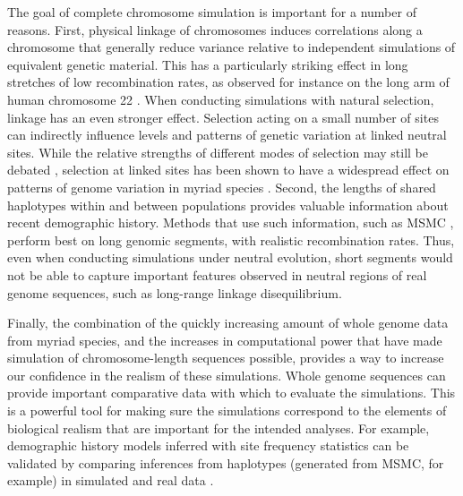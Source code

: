\documentclass[hidelinks]{article}
\begin{document}
The goal of complete chromosome simulation is important for a number of reasons.
First, physical linkage of chromosomes induces correlations along a chromosome that
generally reduce variance relative to independent simulations of equivalent genetic material.
This has a particularly striking effect in long stretches of low recombination rates,
as observed for instance on the long arm of human chromosome 22 \citep{Dawson2002}.
When conducting simulations with natural selection, linkage has
an even stronger effect. Selection acting on a small number of sites can
indirectly influence levels and patterns of genetic variation at linked
neutral sites. While the relative strengths of different modes of selection
may still be debated \citep{kern2018neutral,jensen2019importance},
selection at linked sites has been shown to have a widespread
effect on patterns of genome variation in myriad species
\citep[e.g.,][]{McVicker2009,Charlesworth2012}. 
Second, the lengths of shared haplotypes within and
between populations provides valuable information about recent demographic history.
Methods that use such information, such as MSMC \citep{Schiffels2020}, perform best
on long genomic segments, with realistic recombination rates.
Thus, even when conducting simulations under neutral evolution, short segments
would not be able to capture important features observed in neutral regions of
real genome sequences, such as long-range linkage disequilibrium.
%

Finally, the combination of the quickly increasing amount of whole genome data from
myriad species, and the increases in computational power that have made simulation
of chromosome-length sequences possible, provides a way to increase our confidence
in the realism of these simulations. Whole genome sequences can provide important comparative
data with which to evaluate the simulations. This is a powerful tool for
making sure the simulations correspond to the elements of biological
realism that are important for the intended analyses.
For example, demographic history models inferred with site frequency statistics \citep{Gutenkunst2009}
can be validated by comparing inferences from haplotypes (generated from MSMC, for example)
in simulated and real data \citep[e.g.,][]{Hsieh2016a}.
\end{document}
